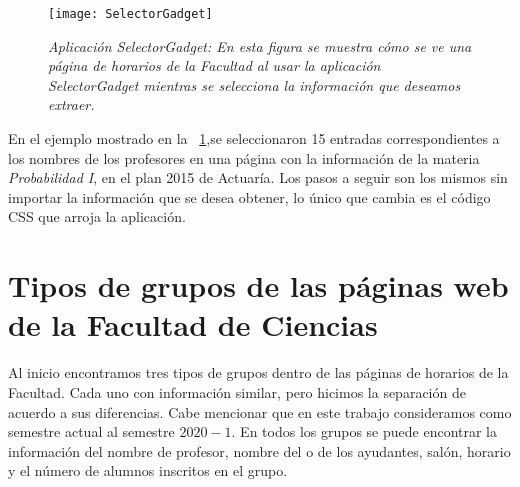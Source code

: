 \begin{figure}[H]
\centering
\texttt{[image: SelectorGadget]} %
\caption[\textit{Aplicación SelectorGadget}]{\textit{Aplicación SelectorGadget: En esta figura se muestra cómo se ve una página de horarios de la Facultad al usar la aplicación SelectorGadget mientras se selecciona la información que deseamos extraer.}}\label{appSelectorGadget}
\end{figure}

En el ejemplo mostrado en la \figurename{~\ref{appSelectorGadget}},se seleccionaron 15 entradas correspondientes a los nombres de los profesores en una página con la información de la materia \textit{Probabilidad I}, en el plan 2015 de Actuaría. Los pasos a seguir son los mismos sin importar la información que se desea obtener, lo único que cambia es el código CSS que arroja la aplicación.


\section{Tipos de grupos de las páginas web de la Facultad de Ciencias} \label{TiposDeGpos}

Al inicio encontramos tres tipos de grupos dentro de las páginas de horarios de la Facultad. Cada uno con información similar, pero hicimos la separación de acuerdo a sus diferencias. Cabe mencionar que en este trabajo consideramos como semestre actual al semestre $2020-1$. En todos los grupos se puede encontrar la información del nombre de profesor, nombre del o de los ayudantes, salón, horario y el número de alumnos inscritos en el grupo.

